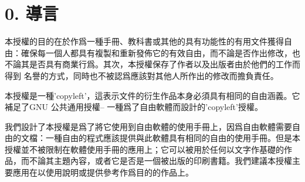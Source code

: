 \section{0. 導言}
本授權的目的在於作爲一種手冊、教科書或其他的具有功能性的有用文件獲得自由：確保每一個人都具有複製和重新發佈它的有效自由，而不論是否作出修改，也不論其是否具有商業行爲。其次，本授權保存了作者以及出版者由於他們的工作而 得到 名譽的方式，同時也不被認爲應該對其他人所作出的修改而擔負責任。\par
本授權是一種’copyleft’，這表示文件的衍生作品本身必須具有相同的自由涵義。它補足了GNU 公共通用授權-- 一種爲了自由軟體而設計的’copyleft’授權。\par
我們設計了本授權是爲了將它使用到自由軟體的使用手冊上，因爲自由軟體需要自由的文檔：一種自由的程式應該提供與此軟體具有相同的自由的使用手冊。但是本授權並不被限制在軟體使用手冊的應用上；它可以被用於任何以文字作基礎的作品，而不論其主題內容，或者它是否是一個被出版的印刷書籍。我們建議本授權主要應用在以使用說明或提供參考作爲目的的作品上。
